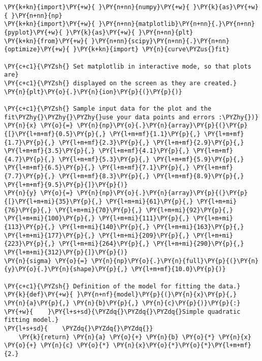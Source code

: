 \begin{Verbatim}[label=\makebox{\href{https://github.com/unipi-physics-labs/lab1-notes/tree/main/snippy/residual_plot.py}{https://github.com/.../residual\_plot.py}},commandchars=\\\{\}]
\PY{k+kn}{import}\PY{+w}{ }\PY{n+nn}{numpy}\PY{+w}{ }\PY{k}{as}\PY{+w}{ }\PY{n+nn}{np}
\PY{k+kn}{import}\PY{+w}{ }\PY{n+nn}{matplotlib}\PY{n+nn}{.}\PY{n+nn}{pyplot}\PY{+w}{ }\PY{k}{as}\PY{+w}{ }\PY{n+nn}{plt}
\PY{k+kn}{from}\PY{+w}{ }\PY{n+nn}{scipy}\PY{n+nn}{.}\PY{n+nn}{optimize}\PY{+w}{ }\PY{k+kn}{import} \PY{n}{curve\PYZus{}fit}

\PY{c+c1}{\PYZsh{} Set matplotlib in interactive mode, so that plots are}
\PY{c+c1}{\PYZsh{} displayed on the screen as they are created.}
\PY{n}{plt}\PY{o}{.}\PY{n}{ion}\PY{p}{(}\PY{p}{)}

\PY{c+c1}{\PYZsh{} Sample input data for the plot and the fit\PYZhy{}\PYZhy{}\PYZhy{}use your data points and errors :\PYZhy{})}
\PY{n}{x} \PY{o}{=} \PY{n}{np}\PY{o}{.}\PY{n}{array}\PY{p}{(}\PY{p}{[}\PY{l+m+mf}{0.5}\PY{p}{,} \PY{l+m+mf}{1.1}\PY{p}{,} \PY{l+m+mf}{1.7}\PY{p}{,} \PY{l+m+mf}{2.3}\PY{p}{,} \PY{l+m+mf}{2.9}\PY{p}{,} \PY{l+m+mf}{3.5}\PY{p}{,} \PY{l+m+mf}{4.1}\PY{p}{,} \PY{l+m+mf}{4.7}\PY{p}{,} \PY{l+m+mf}{5.3}\PY{p}{,} \PY{l+m+mf}{5.9}\PY{p}{,} \PY{l+m+mf}{6.5}\PY{p}{,} \PY{l+m+mf}{7.1}\PY{p}{,} \PY{l+m+mf}{7.7}\PY{p}{,} \PY{l+m+mf}{8.3}\PY{p}{,} \PY{l+m+mf}{8.9}\PY{p}{,} \PY{l+m+mf}{9.5}\PY{p}{]}\PY{p}{)}
\PY{n}{y} \PY{o}{=} \PY{n}{np}\PY{o}{.}\PY{n}{array}\PY{p}{(}\PY{p}{[}\PY{l+m+mi}{35}\PY{p}{,} \PY{l+m+mi}{61}\PY{p}{,} \PY{l+m+mi}{76}\PY{p}{,} \PY{l+m+mi}{70}\PY{p}{,} \PY{l+m+mi}{92}\PY{p}{,} \PY{l+m+mi}{100}\PY{p}{,} \PY{l+m+mi}{111}\PY{p}{,} \PY{l+m+mi}{113}\PY{p}{,} \PY{l+m+mi}{140}\PY{p}{,} \PY{l+m+mi}{163}\PY{p}{,} \PY{l+m+mi}{177}\PY{p}{,} \PY{l+m+mi}{209}\PY{p}{,} \PY{l+m+mi}{223}\PY{p}{,} \PY{l+m+mi}{264}\PY{p}{,} \PY{l+m+mi}{290}\PY{p}{,} \PY{l+m+mi}{312}\PY{p}{]}\PY{p}{)}
\PY{n}{sigma} \PY{o}{=} \PY{n}{np}\PY{o}{.}\PY{n}{full}\PY{p}{(}\PY{n}{y}\PY{o}{.}\PY{n}{shape}\PY{p}{,} \PY{l+m+mf}{10.0}\PY{p}{)}

\PY{c+c1}{\PYZsh{} Definition of the model for fitting the data.}
\PY{k}{def}\PY{+w}{ }\PY{n+nf}{model}\PY{p}{(}\PY{n}{x}\PY{p}{,} \PY{n}{a}\PY{p}{,} \PY{n}{b}\PY{p}{,} \PY{n}{c}\PY{p}{)}\PY{p}{:}
\PY{+w}{    }\PY{l+s+sd}{\PYZdq{}\PYZdq{}\PYZdq{}Simple quadratic fitting model.}
\PY{l+s+sd}{    \PYZdq{}\PYZdq{}\PYZdq{}}
    \PY{k}{return} \PY{n}{a} \PY{o}{+} \PY{n}{b} \PY{o}{*} \PY{n}{x} \PY{o}{+} \PY{n}{c} \PY{o}{*} \PY{n}{x}\PY{o}{*}\PY{o}{*}\PY{l+m+mf}{2.}


\end{Verbatim}
